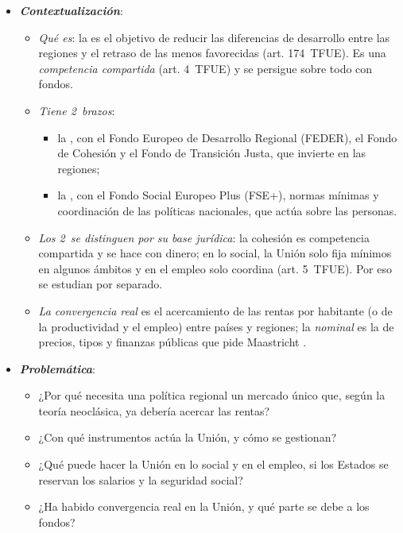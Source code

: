 \documentclass[11pt]{article}
\begin{document}
\begin{itemize}
\item \textbf{\emph{Contextualización}}:
  \begin{itemize}
  \item \emph{Qué es}: la  es el objetivo de reducir las diferencias de desarrollo entre las regiones y el retraso de las menos favorecidas (art. 174~TFUE). Es una \emph{competencia compartida} (art. 4~TFUE) y se persigue sobre todo con fondos.
  \item \emph{Tiene 2~brazos}:
    \begin{itemize}
    \item la , con el Fondo Europeo de Desarrollo Regional (FEDER), el Fondo de Cohesión y el Fondo de Transición Justa, que invierte en las regiones;
    \item la , con el Fondo Social Europeo Plus (FSE+), normas mínimas y coordinación de las políticas nacionales, que actúa sobre las personas.
    \end{itemize}
  \item \emph{Los 2~se distinguen por su base jurídica}: la cohesión es competencia compartida y se hace con dinero; en lo social, la Unión solo fija mínimos en algunos ámbitos y en el empleo solo coordina (art. 5~TFUE). Por eso se estudian por separado.
  \item \emph{La convergencia real} es el acercamiento de las rentas por habitante (o de la productividad y el empleo) entre países y regiones; la \emph{nominal} es la de precios, tipos y finanzas públicas que pide Maastricht .
  \end{itemize}

\item \textbf{\emph{Problemática}}:
  \begin{itemize}
  \item ¿Por qué necesita una política regional un mercado único que, según la teoría neoclásica, ya debería acercar las rentas?
  \item ¿Con qué instrumentos actúa la Unión, y cómo se gestionan?
  \item ¿Qué puede hacer la Unión en lo social y en el empleo, si los Estados se reservan los salarios y la seguridad social?
  \item ¿Ha habido convergencia real en la Unión, y qué parte se debe a los fondos?
  \end{itemize}


\end{itemize}
\end{document}
